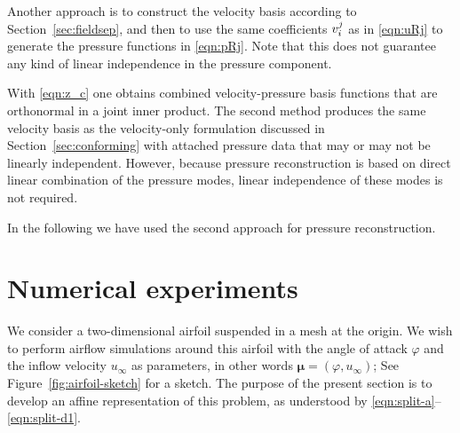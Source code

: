 \documentclass[onecolumn, twoside, a4paper, 11pt]{article}
\begin{document}
Another approach is to construct the velocity basis according to Section~\ref{sec:fieldsep}, and
then to use the same coefficients $\smash[t]{v_i^j}$ as in \eqref{eqn:uRj} to generate the pressure functions
in \eqref{eqn:pRj}. Note that this does not guarantee any kind of linear independence in the
pressure component.

With \eqref{eqn:z_c} one obtains combined velocity-pressure basis functions that are orthonormal in a
joint inner product. The second method produces the same velocity basis as the velocity-only
formulation discussed in Section~\ref{sec:conforming} with attached pressure data that may or may
not be linearly independent. However, because pressure reconstruction is based on direct linear
combination of the pressure modes, linear independence of these modes is not required.

In the following we have used the second approach for pressure reconstruction.

\section{Numerical experiments}
\label{sec:airfoil}

We consider a two-dimensional airfoil suspended in a mesh at the origin. We wish
to perform airflow simulations around this airfoil with the angle of attack
$\varphi$ and the inflow velocity $u_\infty$ as parameters, in other words
$\bm \mu = (\varphi, u_\infty)$; See Figure~\ref{fig:airfoil-sketch} for a
sketch. The purpose of the present section is to develop an affine
representation of this problem, as understood by
\eqref{eqn:split-a}--\eqref{eqn:split-d1}.
\end{document}
